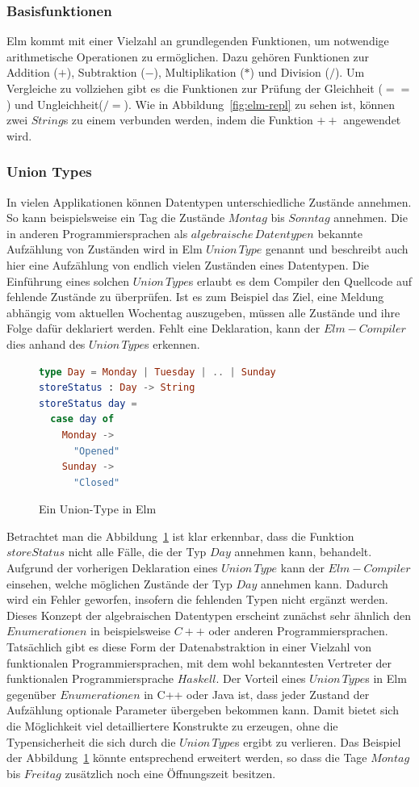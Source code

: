 \subsubsection{Basisfunktionen}
\label{sec:Basisfunktionen}
Elm kommt mit einer Vielzahl an grundlegenden Funktionen, um notwendige arithmetische Operationen zu ermöglichen. Dazu gehören Funktionen zur Addition ($+$), Subtraktion ($-$), Multiplikation ($*$) und Division ($/$). Um Vergleiche zu vollziehen gibt es die Funktionen zur Prüfung der Gleichheit ($==$) und Ungleichheit($/=$). Wie in Abbildung~\ref{fig:elm-repl} zu sehen ist, können zwei $String$s zu einem verbunden werden, indem die Funktion $++$ angewendet wird.

\subsubsection{Union Types}
\label{sec:Union-Types}
In vielen Applikationen können Datentypen unterschiedliche Zustände annehmen. So kann beispielsweise ein Tag die Zustände $Montag$ bis $Sonntag$ annehmen. Die in anderen Programmiersprachen als $algebraische\,Datentypen$ bekannte Aufzählung von Zuständen wird in Elm $Union\,Type$ genannt und beschreibt auch hier eine Aufzählung von endlich vielen Zuständen eines Datentypen. Die Einführung eines solchen $Union\,Type$s erlaubt es dem Compiler den Quellcode auf fehlende Zustände zu überprüfen. Ist es zum Beispiel das Ziel, eine Meldung abhängig vom aktuellen Wochentag auszugeben, müssen alle Zustände und ihre Folge dafür deklariert werden. Fehlt eine Deklaration, kann der $Elm-Compiler$ dies anhand des $Union\,Type$s erkennen.
\begin{figure}[h]
\begin{lstlisting}[language=Elm]
type Day = Monday | Tuesday | .. | Sunday
storeStatus : Day -> String
storeStatus day =
  case day of
    Monday ->
      "Opened"
    Sunday ->
      "Closed"
\end{lstlisting}
\caption{Ein Union-Type in Elm}\label{fig:elm-union-type}
\end{figure}
Betrachtet man die Abbildung~\ref{fig:elm-union-type} ist klar erkennbar, dass die Funktion $storeStatus$ nicht alle Fälle, die der Typ $Day$ annehmen kann, behandelt. Aufgrund der vorherigen Deklaration eines $Union\,Type$ kann der $Elm-Compiler$ einsehen, welche möglichen Zustände der Typ $Day$ annehmen kann. Dadurch wird ein Fehler geworfen, insofern die fehlenden Typen nicht ergänzt werden. Dieses Konzept der algebraischen Datentypen erscheint zunächst sehr ähnlich den $Enumerationen$ in beispielsweise $C++$ oder anderen Programmiersprachen. Tatsächlich gibt es diese Form der Datenabstraktion in einer Vielzahl von funktionalen Programmiersprachen, mit dem wohl bekanntesten Vertreter der funktionalen Programmiersprache $Haskell$. Der Vorteil eines $Union\,Type$s in Elm gegenüber $Enumerationen$ in C++ oder Java ist, dass jeder Zustand der Aufzählung optionale Parameter übergeben bekommen kann. Damit bietet sich die Möglichkeit viel detailliertere Konstrukte zu erzeugen, ohne die Typensicherheit die sich durch die $Union\,Type$s ergibt zu verlieren. Das Beispiel der Abbildung~\ref{fig:elm-union-type} könnte entsprechend erweitert werden, so dass die Tage $Montag$ bis $Freitag$ zusätzlich noch eine Öffnungszeit besitzen.
